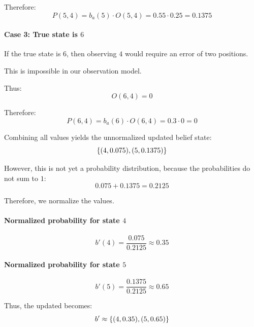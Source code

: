 Therefore:
\[
P(5,4)
=
b_a(5)\cdot O(5,4)
=
0.55\cdot 0.25
=
0.1375
\]

\paragraph{Case 3: True state is $6$}

If the true state is $6$, then observing $4$ would require an error of two positions.

This is impossible in our observation model.

Thus:
\[
O(6,4)=0
\]

Therefore:
\[
P(6,4)
=
b_a(6)\cdot O(6,4)
=
0.3\cdot 0
=
0
\]

Combining all values yields the unnormalized updated belief state:
\[
\left\{
(4,0.075),
(5,0.1375)
\right\}
\]

However, this is not yet a probability distribution, because the probabilities do not sum to $1$:
\[
0.075+0.1375=0.2125
\]

Therefore, we normalize the values.

\paragraph{Normalized probability for state $4$}

\[
b'(4)
=
\frac{0.075}{0.2125}
\approx
0.35
\]

\paragraph{Normalized probability for state $5$}

\[
b'(5)
=
\frac{0.1375}{0.2125}
\approx
0.65
\]

Thus, the updated  becomes:
\[
b'
\approx
\left\{
(4,0.35),
(5,0.65)
\right\}
\]






